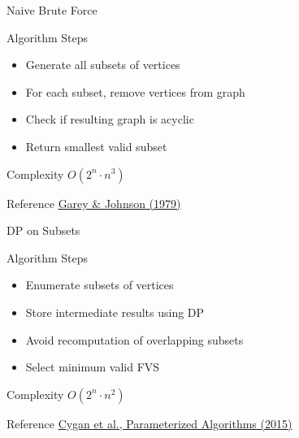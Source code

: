 \documentclass[aspectratio=169]{beamer}
\begin{document}
\begin{frame}{Naive Brute Force}

\begin{block}{Algorithm Steps}
\begin{itemize}
\item Generate all subsets of vertices
\item For each subset, remove vertices from graph
\item Check if resulting graph is acyclic
\item Return smallest valid subset
\end{itemize}
\end{block}

\vspace{0.2cm}

\begin{exampleblock}{Complexity}
$O(2^n \cdot n^3)$
\end{exampleblock}

\vspace{0.2cm}

\begin{alertblock}{Reference}
\href{https://perso.limos.fr/~palafour/PAPERS/PDF/Garey-Johnson79.pdf}{Garey \& Johnson (1979)}
\end{alertblock}

\end{frame}
\begin{frame}{DP on Subsets}

\begin{block}{Algorithm Steps}
\begin{itemize}
\item Enumerate subsets of vertices
\item Store intermediate results using DP
\item Avoid recomputation of overlapping subsets
\item Select minimum valid FVS
\end{itemize}
\end{block}

\begin{exampleblock}{Complexity}
$O(2^n \cdot n^2)$
\end{exampleblock}

\begin{alertblock}{Reference}
\href{https://mimuw.edu.pl/~malcin/book/parameterized-algorithms.pdf}{Cygan et al., Parameterized Algorithms (2015)}
\end{alertblock}

\end{frame}
\end{document}
